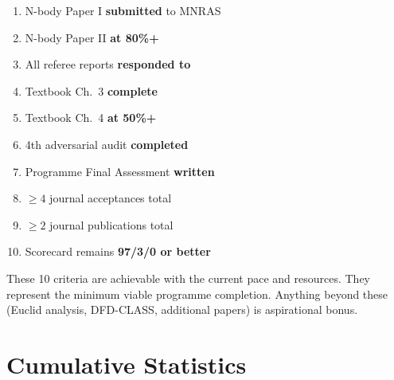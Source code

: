 \documentclass[11pt,a4paper]{article}
\begin{document}
\begin{tcolorbox}[colback=green!5!white, colframe=dfdgreen, title=\textbf{The Final 10: Minimum Success Criteria}]
\begin{enumerate}[nosep]
\item N-body Paper I \textbf{submitted} to MNRAS
\item N-body Paper II \textbf{at 80\%+}
\item All referee reports \textbf{responded to}
\item Textbook Ch.\ 3 \textbf{complete}
\item Textbook Ch.\ 4 \textbf{at 50\%+}
\item 4th adversarial audit \textbf{completed}
\item Programme Final Assessment \textbf{written}
\item $\geq 4$ journal acceptances total
\item $\geq 2$ journal publications total
\item Scorecard remains \textbf{97/3/0 or better}
\end{enumerate}
\end{tcolorbox}

These 10 criteria are achievable with the current pace and resources. They represent the minimum viable programme completion. Anything beyond these (Euclid analysis, DFD-CLASS, additional papers) is aspirational bonus.

\section{Cumulative Statistics}
\end{document}

